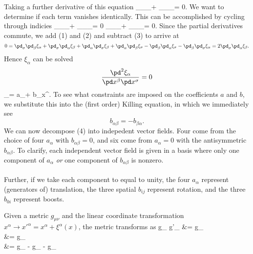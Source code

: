 \documentclass[10pt,letterpaper]{article}
\begin{document}
Taking a further derivative of this equation
\be
	\pd_\sigma \pd_\alpha \xi_\beta + \pd_\sigma \pd_\beta \xi_\alpha = 0.
\ee
We want to determine if each term vanishes identically. This can be accomplished by cycling through indicies
\be
	\pd_\alpha \pd_\sigma \xi_\beta + \pd_\alpha \pd_\beta \xi_\mu = 0
\ee
\be	
	\pd_\beta\pd_\alpha \xi_\sigma + \pd_\beta \pd_\mu \xi_\alpha = 0.
\ee
Since the partial derivatives commute, we add (1) and (2) and subtract (3) to arrive at
\[
	0 = \pd_\sigma \pd_\beta \xi_\alpha + \pd_\sigma \pd_\alpha \xi_\beta + \pd_\alpha \pd_\sigma \xi_\beta
	+ \pd_\alpha \pd_\beta \xi_\sigma - \pd_\beta\pd_\alpha \xi_\sigma - \pd_\beta \pd_\sigma \xi_\alpha = 2\pd_		\sigma \pd_\alpha \xi_\beta .
\]
Hence $\xi_\alpha$ can be solved 
\[
	\frac{\pd^2 \xi_\alpha}{\pd x^\beta \pd x^\sigma} = 0
\]
\be
	\to\quad \xi_\alpha = a_\alpha + b_{\alpha\beta}x^\beta.
\ee
To see what constraints are imposed on the coefficients $a$ and $b$, we substitute this into the (first order) Killing equation, in which we immediately see
\[
	b_{\alpha\beta} = -b_{\beta\alpha}.
\]
We can now decompose (4) into indepedent vector fields. Four come from the choice of four $a_\alpha$ with 
$b_{\alpha\beta} = 0$, and six come from $a_\alpha = 0$ with the antisymmetric $b_{\alpha\beta}$. To clarify, each independent vector field is given in a basis where only one component of $a_\alpha$ \emph{or} one component of $b_{\alpha\beta}$ is nonzero. \\ \\
Further, if we take each component to equal to unity, the four $a_\alpha$ represent (generators of) translation, the three spatial $b_{ij}$ represent rotation, and the three $b_{0i}$ represent boosts. \\
\eenum
\item 
\benum
\item
 Given a metric $g_{\mu\nu}$ and the linear coordinate transformation $x^\alpha \to x'^\alpha = x^\alpha + \xi^\alpha(x)$, the metric transforms as
 \ba
 	g_{\mu\nu} \to g'_{\mu\nu} &= g_{\alpha\beta} \\
	&= 
	g_{\alpha\beta}\\
	&= g_{\mu\nu} - g_{\alpha\nu} - g_{\mu\beta} \\
\end{document}
